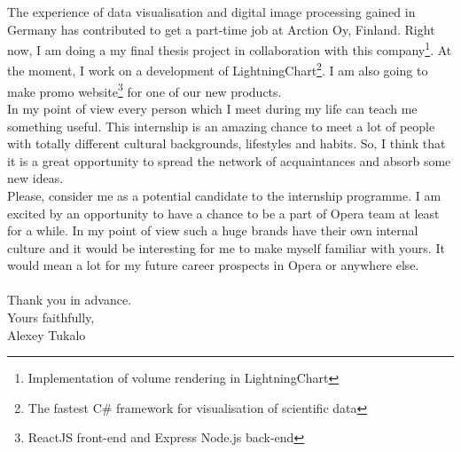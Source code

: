 \documentclass[english]{article}
\begin{document}
The experience of data visualisation and digital image processing gained in Germany has contributed to get a part-time job at Arction Oy, Finland. Right now, I am doing a my final thesis project in collaboration with this company\footnote{Implementation of volume rendering in LightningChart}. At the moment, I work on a development of LightningChart\footnote{The fastest C\# framework for visualisation of scientific data}. I am also going to make promo website\footnote{ReactJS front-end and Express Node.js back-end} for one of our new products.\\

In my point of view every person which I meet during my life can teach me something useful. This internship is an amazing chance to meet a lot of people with totally different cultural backgrounds, lifestyles and habits. So, I think that it is a great opportunity to spread the network of acquaintances and absorb some new ideas.\\

Please, consider me as a potential candidate to the internship programme. I am excited by an opportunity to have a chance to be a part of Opera team at least for a while. In my point of view such a huge brands have their own internal culture and it would be interesting for me to make myself familiar with yours. It would mean a lot for my future career prospects in Opera or anywhere else. \\\\


Thank you in advance.\\
Yours faithfully,\\
Alexey Tukalo
    
\end{document}
